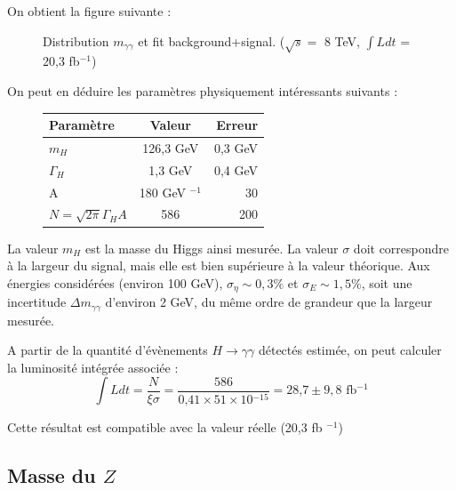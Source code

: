 \documentclass[11pt]{article} %
\begin{document}
On obtient la figure suivante :

\begin{figure}[H]
\centering
  \caption{Distribution $m_{\gamma \gamma}$ et fit background+signal. ($\sqrt{s} =$ 8 TeV,  $\int L dt$ = 20,3 fb$^{-1}$) }
 \resizebox{.9\linewidth}{!}{}
\end{figure}

On peut en déduire les paramètres physiquement intéressants suivants :

\begin{figure}[H]
\centering
\begin{tabular}{|l|c|r|} 
   \hline
   Paramètre & Valeur & Erreur \\
    \hline
   $m_H$ & 126,3 GeV & 0,3 GeV\\
  \hline
   $\Gamma_H$ & 1,3 GeV & 0,4 GeV \\
  \hline
A & 180 GeV ${}^{-1}$ & 30\\

 \hline
$N = \sqrt{2\pi} \Gamma_H A$ & 586 & 200\\
\hline
\end{tabular}
\end{figure}

La valeur $m_H$ est la masse du Higgs ainsi mesurée. La valeur $\sigma$ doit correspondre à la largeur du signal, mais elle est bien supérieure à la valeur théorique. Aux énergies considérées (environ 100 GeV), $\sigma_{\eta} \sim 0,3 \%$ \cite{resolution_position_photons} et $\sigma_{E} \sim 1,5 \%$, soit une incertitude $\Delta m_{\gamma\gamma}$ d'environ 2 GeV, du même ordre de grandeur que la largeur mesurée.


A partir de la quantité d'évènements $H \to \gamma \gamma$ détectés estimée, on peut calculer la luminosité intégrée associée :
\begin{equation}
\int L dt = \dfrac{N}{\xi \sigma} = \dfrac{\mbox{586}}{\mbox{0,41} \times \mbox{51} \times \mbox{10} {}^{-15}} = \mbox{28,7} \pm 9,8 \mbox{  fb}{}^{-1}
\end{equation}

Cette résultat est compatible avec la valeur réelle (20,3 fb ${}^{-1}$)

\subsection{Masse du $Z$}
\end{document}
